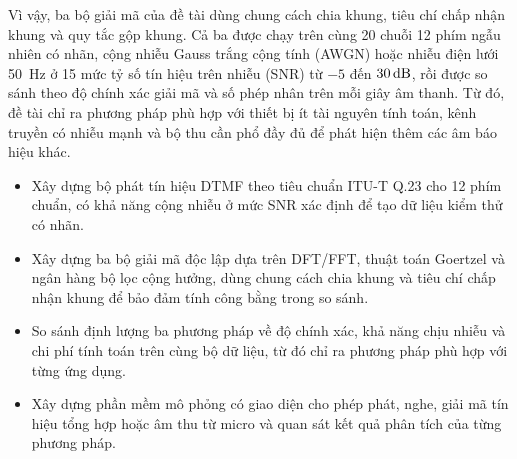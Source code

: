 \documentclass{dtmf_report}
\begin{document}
Vì vậy, ba bộ giải mã của đề tài dùng chung cách chia khung, tiêu chí chấp nhận khung và quy tắc gộp khung. Cả ba được chạy trên cùng 20 chuỗi 12 phím ngẫu nhiên có nhãn, cộng nhiễu Gauss trắng cộng tính (AWGN) hoặc nhiễu điện lưới 50~Hz ở 15 mức tỷ số tín hiệu trên nhiễu (SNR) từ $-5$ đến $30\,\mathrm{dB}$, rồi được so sánh theo độ chính xác giải mã và số phép nhân trên mỗi giây âm thanh. Từ đó, đề tài chỉ ra phương pháp phù hợp với thiết bị ít tài nguyên tính toán, kênh truyền có nhiễu mạnh và bộ thu cần phổ đầy đủ để phát hiện thêm các âm báo hiệu khác.


\begin{itemize}
  \item Xây dựng bộ phát tín hiệu DTMF theo tiêu chuẩn \mbox{ITU-T} Q.23 cho 12
        phím chuẩn, có khả năng cộng nhiễu ở mức SNR xác định để tạo dữ liệu
        kiểm thử có nhãn.
  \item Xây dựng ba bộ giải mã độc lập dựa trên DFT/FFT, thuật toán Goertzel và
        ngân hàng bộ lọc cộng hưởng, dùng chung cách chia khung và tiêu chí chấp nhận
        khung để bảo đảm tính công bằng trong so sánh.
  \item So sánh định lượng ba phương pháp về độ chính xác, khả năng chịu nhiễu và chi
        phí tính toán trên cùng bộ dữ liệu, từ đó chỉ ra phương pháp phù hợp với
        từng ứng dụng.
  \item Xây dựng phần mềm mô phỏng có giao diện cho phép phát, nghe,
        giải mã tín hiệu tổng hợp hoặc âm thu từ micro và quan sát
        kết quả phân tích của từng phương pháp.
\end{itemize}

\end{document}
